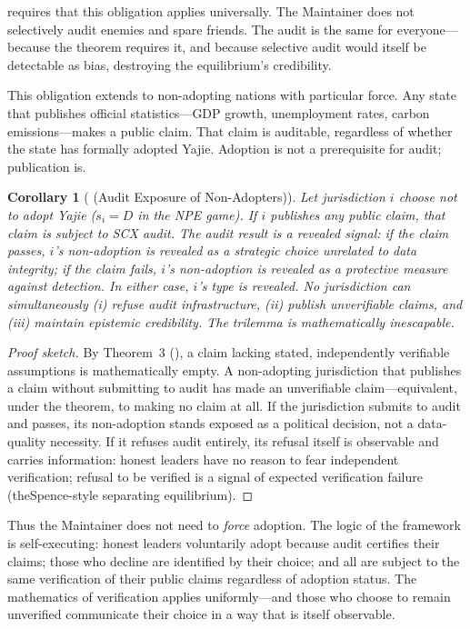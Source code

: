\documentclass[12pt,a4paper]{article}
\newtheorem{corollary}[theorem]{Corollary}
\theoremstyle{definition}
\theoremstyle{remark}
\begin{document}
 requires that this obligation applies universally. The Maintainer does not selectively audit enemies and spare friends. The audit is the same for everyone—because the theorem requires it, and because selective audit would itself be detectable as bias, destroying the equilibrium's credibility.

This obligation extends to non-adopting nations with particular force. Any state that publishes official statistics—GDP growth, unemployment rates, carbon emissions—makes a public claim. That claim is auditable, regardless of whether the state has formally adopted Yajie. Adoption is not a prerequisite for audit; publication is.

\begin{corollary}[ (Audit Exposure of Non-Adopters)]
\label{cor:non-adopter-exposure}
Let jurisdiction $i$ choose not to adopt Yajie ($s_i = D$ in the NPE game). If $i$ publishes any public claim, that claim is subject to SCX audit. The audit result is a revealed signal: if the claim passes, $i$'s non-adoption is revealed as a strategic choice unrelated to data integrity; if the claim fails, $i$'s non-adoption is revealed as a protective measure against detection. In either case, $i$'s type is revealed. No jurisdiction can simultaneously (i) refuse audit infrastructure, (ii) publish unverifiable claims, and (iii) maintain epistemic credibility. The trilemma is mathematically inescapable.
\end{corollary}

\begin{proof}[Proof sketch]
By Theorem~3 (), a claim lacking stated, independently verifiable assumptions is mathematically empty. A non-adopting jurisdiction that publishes a claim without submitting to audit has made an unverifiable claim—equivalent, under the theorem, to making no claim at all. If the jurisdiction submits to audit and passes, its non-adoption stands exposed as a political decision, not a data-quality necessity. If it refuses audit entirely, its refusal itself is observable and carries information: honest leaders have no reason to fear independent verification; refusal to be verified is a signal of expected verification failure (theSpence-style separating equilibrium).
\end{proof}

Thus the Maintainer does not need to \textit{force} adoption. The logic of the framework is self-executing: honest leaders voluntarily adopt because audit certifies their claims; those who decline are identified by their choice; and all are subject to the same verification of their public claims regardless of adoption status. The mathematics of verification applies uniformly—and those who choose to remain unverified communicate their choice in a way that is itself observable.
\end{document}
